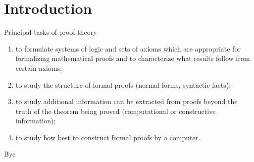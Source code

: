 \section{Introduction}
\begin{frame}
	Principal tasks of proof theory \cite{buss1998handbook}
	\begin{enumerate}
		\item to formulate systems of logic and sets of axioms which are appropriate for formalizing mathematical proofs and to characterize what results follow from certain axioms;
		\item to study the structure of formal proofs (normal forms, syntactic facts);
		\item to study additional information can be extracted from proofs beyond the truth of the theorem being proved (computational or constructive information);
		\item to study how best to construct formal proofs by a computer.
	\end{enumerate}
\end{frame}

\begin{frame}
	Bye
\end{frame}